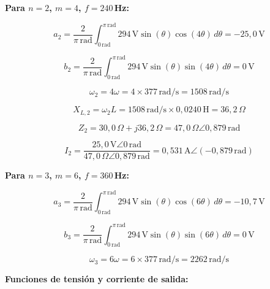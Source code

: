 \documentclass[12pt,a4paper]{article}
\begin{document}
\textbf{Para $n=2$, $m=4$, $f=240$\,Hz:}

\begin{equation}
    a_2 = \frac{2}{\pi\,\text{rad}} \int_{0\,\text{rad}}^{\pi\,\text{rad}} 294\,\text{V}\sin(\theta)\cos(4\theta)\,d\theta = -25{,}0\,\text{V}
\end{equation}

\begin{equation}
    b_2 = \frac{2}{\pi\,\text{rad}} \int_{0\,\text{rad}}^{\pi\,\text{rad}} 294\,\text{V}\sin(\theta)\sin(4\theta)\,d\theta = 0\,\text{V}
\end{equation}

\begin{equation}
    \omega_2 = 4\omega = 4 \times 377\,\text{rad/s} = 1508\,\text{rad/s}
\end{equation}

\begin{equation}
    X_{L,2} = \omega_2 L = 1508\,\text{rad/s} \times 0{,}0240\,\text{H} = 36{,}2\,\Omega
\end{equation}

\begin{equation}
    Z_2 = 30{,}0\,\Omega + j36{,}2\,\Omega = 47{,}0\,\Omega \angle 0{,}879\,\text{rad}
\end{equation}

\begin{equation}
    I_2 = \frac{25{,}0\,\text{V}\angle 0\,\text{rad}}{47{,}0\,\Omega \angle 0{,}879\,\text{rad}} = 0{,}531\,\text{A}\angle(-0{,}879\,\text{rad})
\end{equation}

\textbf{Para $n=3$, $m=6$, $f=360$\,Hz:}

\begin{equation}
    a_3 = \frac{2}{\pi\,\text{rad}} \int_{0\,\text{rad}}^{\pi\,\text{rad}} 294\,\text{V}\sin(\theta)\cos(6\theta)\,d\theta = -10{,}7\,\text{V}
\end{equation}

\begin{equation}
    b_3 = \frac{2}{\pi\,\text{rad}} \int_{0\,\text{rad}}^{\pi\,\text{rad}} 294\,\text{V}\sin(\theta)\sin(6\theta)\,d\theta = 0\,\text{V}
\end{equation}

\begin{equation}
    \omega_3 = 6\omega = 6 \times 377\,\text{rad/s} = 2262\,\text{rad/s}
\end{equation}


\textbf{Funciones de tensión y corriente de salida:}
\end{document}
